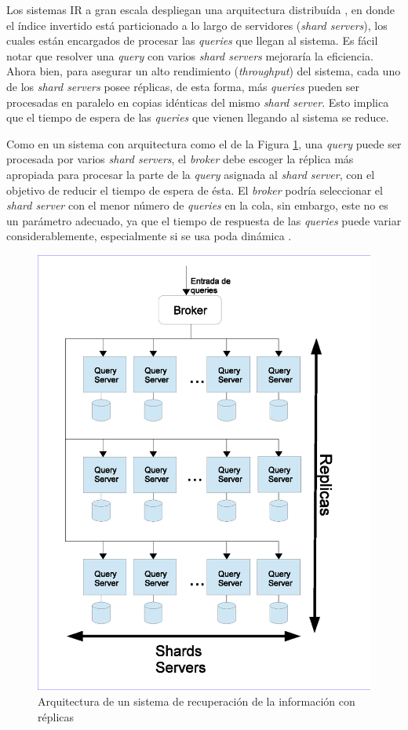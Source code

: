 Los sistemas IR a gran escala despliegan una arquitectura distribuída \citep{Dean:2009}, en donde el índice invertido está particionado \citep{Barroso:2003} a lo largo de servidores (\textit{shard servers}), los cuales están encargados de procesar las \textit{queries} que llegan al sistema. Es fácil notar que resolver una \textit{query} con varios \textit{shard servers} mejoraría la eficiencia. Ahora bien, para asegurar un alto rendimiento (\textit{throughput}) del sistema, cada uno de los \textit{shard servers} posee réplicas, de esta forma, más \textit{queries} pueden ser procesadas en paralelo en copias idénticas del mismo \textit{shard server}. Esto implica que el tiempo de espera de las \textit{queries} que vienen llegando al sistema se reduce. 

Como en un sistema con arquitectura como el de la Figura \ref{fig:sistemaIR}, una \textit{query} puede ser procesada por varios \textit{shard servers}, el \textit{broker} debe escoger la réplica más apropiada para procesar la parte de la \textit{query} asignada al \textit{shard server}, con el objetivo de reducir el tiempo de espera de ésta. El \textit{broker} podría seleccionar el \textit{shard server} con el menor número de \textit{queries} en la cola, sin embargo, este no es un parámetro adecuado, ya que el tiempo de respuesta de las \textit{queries} puede variar considerablemente, especialmente si se usa poda dinámica \citep{Broder:2003, Moffat:1996}. 


\begin{figure}[tp]
\centering
\includegraphics[scale=.75]{images/sistemaIR.eps}
\caption{Arquitectura de un sistema de recuperación de la información con réplicas}
\label{fig:sistemaIR}
\end{figure}

